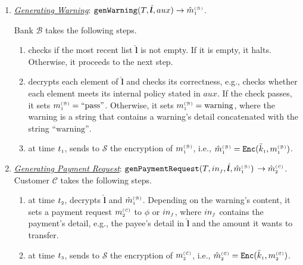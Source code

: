 \begin{enumerate}[leftmargin=.46cm]
 



\item\label{Generating-Warning} \underline{\textit{Generating Warning}}: $\mathtt{genWarning}(T, {\hat{\bm l}}, aux)\rightarrow \hat m^{\scriptscriptstyle\mathcal{(B)}}_{\scriptscriptstyle1}$.

Bank $\mathcal{B}$ takes the following steps. 
\begin{enumerate}
%
\item  checks if the most recent list $\hat{\bm{l}}$ is not empty. If it is empty, it halts. Otherwise, it proceeds to the next step. 
%
\item  decrypts each element of $\hat{\bm l}$ and checks its correctness, e.g., checks whether each element meets its internal policy  stated in $aux$. If the check passes, it sets $m_{\scriptscriptstyle 1}^{\scriptscriptstyle(\mathcal{B})}= \text{``pass''}$. Otherwise, it sets $m_{\scriptscriptstyle 1}^{\scriptscriptstyle(\mathcal{B})}=\text{warning}$, where the warning is a  string that contains a warning's detail concatenated with the string $\text{``warning''}$.
%
\item at time $t_{\scriptscriptstyle 1}$, sends to $\mathcal{S}$ the encryption of $m_{\scriptscriptstyle 1}^{\scriptscriptstyle(\mathcal{B})}$, i.e.,  $\hat m_{\scriptscriptstyle 1}^{\scriptscriptstyle(\mathcal{B})}= \mathtt{Enc}(\bar k_{\scriptscriptstyle 1}, m_{\scriptscriptstyle 1}^{\scriptscriptstyle(\mathcal B)})$. 
\end{enumerate}



\item\label{clinet-at-T2} \underline{\textit{Generating Payment Request}}: $\mathtt{genPaymentRequest}(T, in_{\scriptscriptstyle f}, \hat{\bm{l}}, \\\hat m^{\scriptscriptstyle\mathcal{(B)}}_{\scriptscriptstyle1})$ $\rightarrow \hat m^{\scriptscriptstyle\mathcal{(C)}}_{\scriptscriptstyle2}$.
%
Customer $\mathcal{C}$ takes the following steps. 
\begin{enumerate}
%
\item\label{decrypt-warning} at time $t_{\scriptscriptstyle 2}$, decrypts  $\hat{\bm{l}}$ and $\hat m_{\scriptscriptstyle 1}^{\scriptscriptstyle(\mathcal{B})}$.  Depending on the warning's content, it sets a payment request $m_{\scriptscriptstyle 2}^{\scriptscriptstyle(\mathcal C)}$ to  $\phi$ or  $in_{\scriptscriptstyle f}$, where $in_{\scriptscriptstyle f}$ contains the payment's detail, e.g., the payee's detail in $\hat {\bm l}$ and the amount it wants to transfer. 
%
\item\label{send-payment-req} at time $t_{\scriptscriptstyle 3}$, sends  to $\mathcal{S}$ the encryption of $m_{\scriptscriptstyle 2}^{\scriptscriptstyle(\mathcal C)}$, i.e., $\hat m_{\scriptscriptstyle 2}^{\scriptscriptstyle(\mathcal{C})} = \mathtt{Enc}(\bar k_{\scriptscriptstyle 1}, m_{\scriptscriptstyle 2}^{\scriptscriptstyle(\mathcal C)})$.
\end{enumerate}
%


\end{enumerate}
